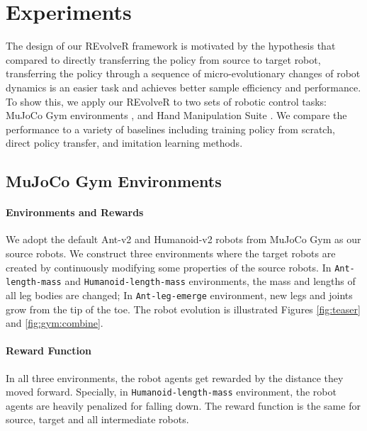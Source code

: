 \documentclass[nohyperref]{article}
\theoremstyle{plain}
\theoremstyle{definition}
\theoremstyle{remark}
\begin{document}
\section{Experiments}\label{sec:exp}

The design of our REvolveR framework is motivated by the hypothesis that compared to directly transferring the policy from source to target robot, transferring the policy through a sequence of micro-evolutionary changes of robot dynamics is an easier task and achieves better sample efficiency and performance.
To show this, we apply our REvolveR to two sets of robotic control tasks:
MuJoCo Gym environments \cite{mujoco:gym}, and
Hand Manipulation Suite \cite{dapg}.
We compare the performance to a variety of baselines including training policy from scratch, direct policy transfer, and imitation learning methods.


\subsection{MuJoCo Gym Environments } \label{sec:gym}






\paragraph{Environments and Rewards}
We adopt the default Ant-v2 and Humanoid-v2 robots from MuJoCo Gym \cite{mujoco:gym} as our source robots. 
We construct three environments where the target robots are created by continuously modifying some properties of the source robots.
In \texttt{Ant-length-mass} and \texttt{Humanoid-length-mass} environments, the mass and lengths of all leg bodies are changed;
In \texttt{Ant-leg-emerge} environment, new legs and joints grow from the tip of the toe.
The robot evolution is illustrated Figures \ref{fig:teaser} and \ref{fig:gym:combine}.

\paragraph{Reward Function}

In all three environments, the robot agents get rewarded by the distance they moved forward.
Specially, in \texttt{Humanoid-length-mass} environment, the robot agents are heavily penalized for falling down.
The reward function is the same for source, target and all intermediate robots.
\end{document}
